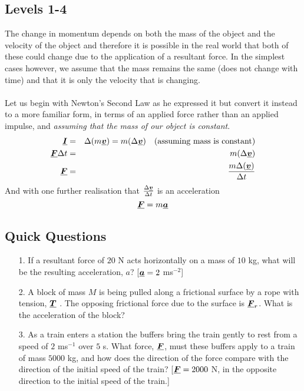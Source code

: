\subsection*{Levels 1-4}
The change in momentum depends on both the mass of the object and the velocity of the object and therefore it is possible in the real world that both of these could change due to the application of a resultant force. In the simplest cases however, we assume that the mass remains the same (does not change with time) and that it is only the velocity that is changing. 
\\
\\
Let us begin with Newton's Second Law as he expressed it but convert it instead to a more familiar form, in terms of an applied force rather than an applied impulse, and {\it assuming that the mass of our object is constant}.     
\begin{eqnarray}
{\vtr I}&=&\Delta({m {\vtr v}}) =m(\Delta{\vtr v})\ \ \ (\mbox{assuming mass is constant})\nonumber\\
{\vtr F}\Delta t&=&m(\Delta{\vtr v}) \nonumber \\
{\vtr F}&=&\frac{m\Delta({\vtr v})}{\Delta t} \label{eqn:NIIF}
\end{eqnarray}
And with one further realisation that $\frac{\Delta {\mathit{\underline{\boldsymbol{v}}}}}{\Delta t}$  is an acceleration
\begin{equation}
{\mathit{\underline{\boldsymbol{F}}}}=m {\mathit{\underline{\boldsymbol{a}}}}
\end{equation}

\subsection*{Quick Questions}
\begin{itemize}
\item[1.] If a resultant force of $20$ N acts horizontally on a mass of $10$ kg, what will be the resulting acceleration, $a$?  \color{red}[${\mathit{\underline{\boldsymbol{a}}}}=2$ ms$^{-2}$]\color{black}
\item[2.] A block of mass $M$ is being pulled along a frictional surface by a rope with tension, ${\mathit{\underline{\boldsymbol{T}}}}$ .  The opposing frictional force due to the surface is ${\mathit{\underline{\boldsymbol{F}}}_r}$.  What is the acceleration of the block?  \color{red}
\begin{equation}
[{\vtr a}=\frac{{\vtr T}-{\vtr F_r}}{M}]\nonumber
\end{equation}\color{black}
\item[3.] As a train enters a station the buffers bring the train gently to rest from a speed of $2$ ms$^{-1}$ over $5$ s.  What force, ${\mathit{\underline{\boldsymbol{F}}}}$, must these buffers apply to a train of mass $5000$ kg, and how does the direction of the force compare with the direction of the initial speed of the train? \color{red}[${\mathit{\underline{\boldsymbol{F}}}}=2000$ N, in the opposite direction to the initial speed of the train.]\color{black}
\end{itemize}

